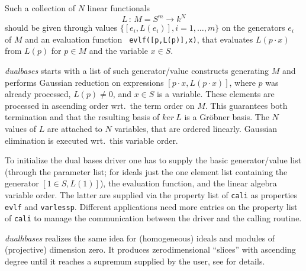 \documentclass[a4paper,11pt]{article}
\newcommand{\gr}{Gr\"obner}
\newcommand{\ind}[1]{{\em #1}\index{#1}}
\begin{document}
Such a collection of $N$ linear functionals
\[L\,:\, M=S^m \longrightarrow k^N\]
should be given through values $\{[e_i,L(e_i)], i=1,\ldots,m\}$ on the
generators $e_i$ of $M$ and an evaluation function {\tt
evlf([p,L(p)],x)}, that evaluates $L(p\cdot x)$ from $L(p)$ for $p\in
M$ and the variable $x\in S$.  

\ind{dualbases} starts with a list of such generator/value constructs
generating $M$ and performs Gaussian reduction on expressions $[p\cdot
x,L(p\cdot x)]$, where $p$ was already processed, $L(p)\neq 0$, and
$x\in S$ is a variable. These elements are processed in ascending order
wrt.\ the term order on $M$. This guarantees both termination and that
the resulting basis of $ker\ L$ is a {\gr} basis. The $N$ values of $L$
are attached to $N$ variables, that are ordered linearly. Gaussian
elimination is executed wrt.\ this variable order.

To initialize the dual bases driver one has to supply the basic
generator/value list (through the parameter list; for ideals just the
one element list containing the generator $[1\in S,L(1)]$), the
evaluation function, and the linear algebra variable order. The latter
are supplied via the property list of {\tt cali} as properties {\tt
evlf} and {\tt varlessp}. Different applications need more entries
on the property list of {\tt cali} to manage the communication between
the driver and the calling routine.

\ind{dualhbases} realizes the same idea for (homogeneous) ideals and
modules of (projective) dimension zero. It produces zerodimensional
``slices'' with ascending degree until it reaches a supremum supplied
by the user, see \cite{MMM} for details.
\medskip
\end{document}
